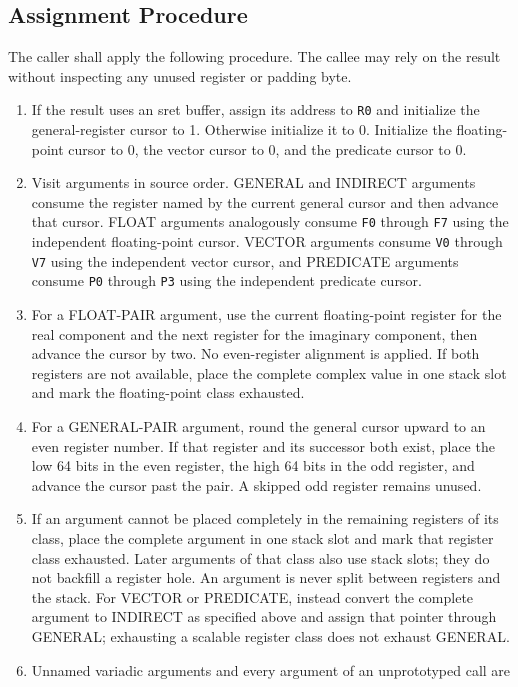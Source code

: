 \documentclass[10pt,twoside]{article}
\begin{document}
\subsection{Assignment Procedure}
The caller shall apply the following procedure. The callee may rely on the
result without inspecting any unused register or padding byte.

\begin{enumerate}[leftmargin=1.35em,itemsep=3pt,topsep=3pt]
\item If the result uses an sret buffer, assign its address to \texttt{R0} and
initialize the general-register cursor to 1. Otherwise initialize it to 0.
Initialize the floating-point cursor to 0, the vector cursor to 0, and the
predicate cursor to 0.
\item Visit arguments in source order. GENERAL and INDIRECT arguments consume
the register named by the current general cursor and then advance that cursor.
FLOAT arguments analogously consume \texttt{F0} through \texttt{F7} using the
independent floating-point cursor. VECTOR arguments consume \texttt{V0}
through \texttt{V7} using the independent vector cursor, and PREDICATE
arguments consume \texttt{P0} through \texttt{P3} using the independent
predicate cursor.
\item For a FLOAT-PAIR argument, use the current floating-point register for
the real component and the next register for the imaginary component, then
advance the cursor by two. No even-register alignment is applied. If both
registers are not available, place the complete complex value in one stack
slot and mark the floating-point class exhausted.
\item For a GENERAL-PAIR argument, round the general cursor upward to an even
register number. If that register and its successor both exist, place the low
64 bits in the even register, the high 64 bits in the odd register, and advance
the cursor past the pair. A skipped odd register remains unused.
\item If an argument cannot be placed completely in the remaining
registers of its class, place the complete argument in one stack slot and mark
that register class exhausted. Later arguments of that class also use stack
slots; they do not backfill a register hole. An argument is never split between
registers and the stack.
For VECTOR or PREDICATE, instead convert the complete argument to INDIRECT as
specified above and assign that pointer through GENERAL; exhausting a scalable
register class does not exhaust GENERAL.
\item Unnamed variadic arguments and every argument of an unprototyped call are

\end{enumerate}
\end{document}
